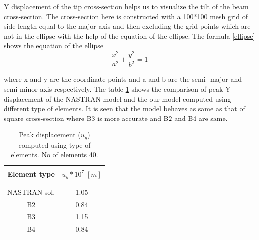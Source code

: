 \documentclass[a4paper,12pt]{article}
\begin{document}
Y displacement of the tip cross-section helps us to visualize the tilt of the beam cross-section. The cross-section here is constructed with a 100*100 mesh grid of side length equal to the major axis and then excluding the grid points which are not in the ellipse with the help of the equation of the ellipse. The formula \ref{ellipse} shows the equation of the ellipse
\\
\begin{equation}
\frac{x^{2}}{a^{2}} + \frac{y^{2}}{b^{2}} = 1
\label{ellipse}
\end{equation}

where x and y are the coordinate points and a and b are the semi- major and semi-minor axis respectively. The table \ref{tab:table 10}  shows the comparison of peak Y displacement of the NASTRAN model and the our model computed using different type of elements. It is seen that the model behaves as same as that of square cross-section where B3 is more accurate and B2 and B4 are same.
\\
\begin{table}[h!]
  \begin{center}
     \begin{tabular}{c c}
      \hline\\
      \textbf{Element type} & \textbf{$u_{y}*10^{7}\;[m]$} \\
      \\
      \hline
      \\[-2pt]
       NASTRAN sol. & 1.05 \\[5pt]
       B2 & 0.84\\[5pt]
       B3 & 1.15 \\[5pt]
       B4 & 0.84 \\[5pt]

      \hline
     \end{tabular}
    \caption{Peak displacement ($u_{y}$) computed  using type of elements. No of elements 40.}
    \label{tab:table 10}
  \end{center}
\end{table}
\end{document}
